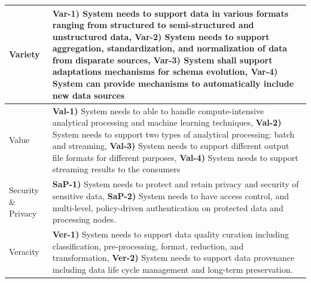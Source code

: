 \documentclass[a4paper,11pt,article,oneside]{memoir}
\begin{document}
\begin{enumerate}
\begin{table}[h]
\begin{tabular}{|m{1.2cm}|m{14cm}|}
            \hline
    
            Variety & 
    
            \textbf{Var-1)} System needs to support data in various formats ranging from structured to semi-structured and unstructured data, \textbf{Var-2)} System needs to support aggregation, standardization, and normalization of data from disparate sources, \textbf{Var-3)} System shall support adaptations mechanisms for schema evolution, \textbf{Var-4)} System can provide mechanisms to automatically include new data sources 
            \\
    
            \hline
    
            Value & 
            
            \textbf{Val-1)} System needs to able to handle compute-intensive analytical processing and machine learning techniques, \textbf{Val-2)} System needs to support two types of analytical processing: batch and streaming, \textbf{Val-3)} System needs to support different output file formats for different purposes, \textbf{Val-4)} System needs to support streaming results to the consumers 
            \\
    
            \hline
    
            Security \& Privacy & 
            
            \textbf{SaP-1)} System needs to protect and retain privacy and security of sensitive data, \textbf{SaP-2)} System needs to have access control, and multi-level, policy-driven authentication on protected data and processing nodes. 
            \\
    
            \hline
            
            Veracity &
            
            \textbf{Ver-1)} System needs to support data quality curation including classification, pre-processing, format, reduction, and  transformation, \textbf{Ver-2)} System needs to support data provenance including data life cycle management and long-term preservation.
            \\
            \hline
      
        \end{tabular}
        \label{table-requirements}
        \end{table}

\end{enumerate}
\end{document}
